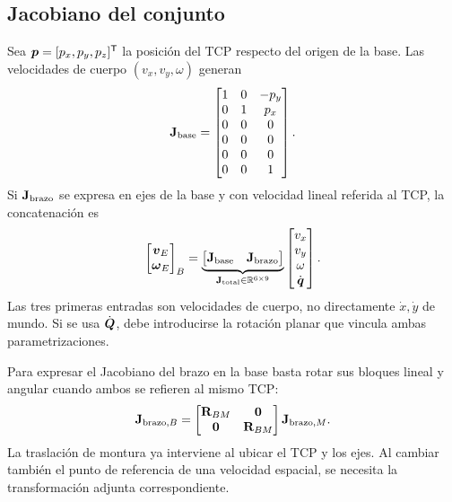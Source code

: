 \subsection{Jacobiano del conjunto}
Sea $\boldsymbol{p}=[p_x,p_y,p_z]^{\mathsf{T}}$ la posición del TCP respecto del origen de la base. Las velocidades de cuerpo $(v_x,v_y,\omega)$ generan
\begin{equation}
\mathbf{J}_{\mathrm{base}}=
\begin{bmatrix}
1&0&-p_y\\0&1&p_x\\0&0&0\\0&0&0\\0&0&0\\0&0&1
\end{bmatrix}.
\end{equation}
Si $\mathbf{J}_{\mathrm{brazo}}$ se expresa en ejes de la base y con velocidad lineal referida al TCP, la concatenación es
\begin{equation}
\begin{bmatrix}\boldsymbol{v}_E\\\boldsymbol{\omega}_E\end{bmatrix}_B
=\underbrace{\begin{bmatrix}\mathbf{J}_{\mathrm{base}}&\mathbf{J}_{\mathrm{brazo}}\end{bmatrix}}_{\mathbf{J}_{\mathrm{total}}\in\mathbb R^{6\times9}}
\begin{bmatrix}v_x\\v_y\\\omega\\\dot{\boldsymbol{q}}\end{bmatrix}.
\end{equation}
Las tres primeras entradas son velocidades de cuerpo, no directamente $\dot x,\dot y$ de mundo. Si se usa $\dot{\boldsymbol{Q}}$, debe introducirse la rotación planar que vincula ambas parametrizaciones.

Para expresar el Jacobiano del brazo en la base basta rotar sus bloques lineal y angular cuando ambos se refieren al mismo TCP:
\begin{equation}
\mathbf{J}_{\mathrm{brazo},B}=
\begin{bmatrix}\mathbf{R}_{BM}&\mathbf{0}\\\mathbf{0}&\mathbf{R}_{BM}\end{bmatrix}
\mathbf{J}_{\mathrm{brazo},M}.
\end{equation}
La traslación de montura ya interviene al ubicar el TCP y los ejes. Al cambiar también el punto de referencia de una velocidad espacial, se necesita la transformación adjunta correspondiente.

